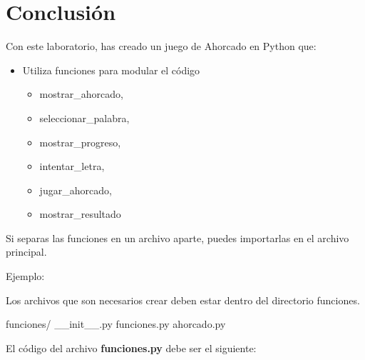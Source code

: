 \documentclass[
  a4paper,
  DIV=11,
  numbers=noendperiod,
  onepage,
  openany]{scrreprt}
\newenvironment{Shaded}{\begin{snugshade}}{\end{snugshade}}
\newcommand{\ExtensionTok}[1]{\textcolor[rgb]{0.00,0.23,0.31}{#1}}
\providecommand{\tightlist}{%
  \setlength{\itemsep}{0pt}\setlength{\parskip}{0pt}}\usepackage{longtable,booktabs,array}
\begin{document}
\chapter{Conclusión}\label{conclusiuxf3n-4}

Con este laboratorio, has creado un juego de Ahorcado en Python que:

\begin{itemize}
\item
  Utiliza funciones para modular el código

  \begin{itemize}
  \tightlist
  \item
    mostrar\_ahorcado,
  \item
    seleccionar\_palabra,
  \item
    mostrar\_progreso,
  \item
    intentar\_letra,
  \item
    jugar\_ahorcado,
  \item
    mostrar\_resultado
  \end{itemize}
\end{itemize}

Si separas las funciones en un archivo aparte, puedes importarlas en el
archivo principal.

Ejemplo:

Los archivos que son necesarios crear deben estar dentro del directorio
funciones.

\begin{Shaded}
\begin{Highlighting}[]
\ExtensionTok{funciones/}
    \ExtensionTok{\_\_init\_\_.py}
    \ExtensionTok{funciones.py}
\ExtensionTok{ahorcado.py}
\end{Highlighting}
\end{Shaded}

El código del archivo \textbf{funciones.py} debe ser el siguiente:
\end{document}
